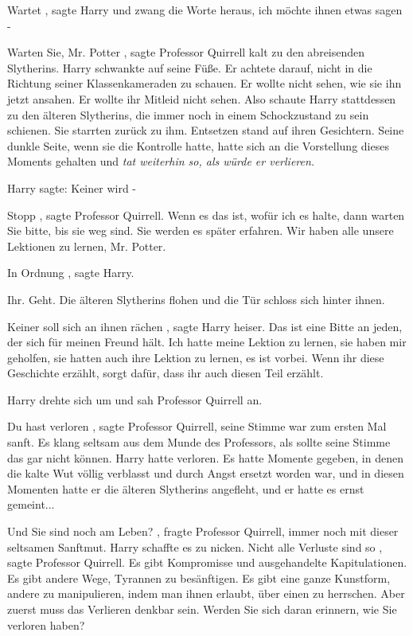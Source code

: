 \glqq Wartet\grqq{} , sagte Harry und zwang die Worte heraus, \glqq ich möchte
ihnen etwas sagen -\grqq{}

\glqq Warten Sie, Mr. Potter\grqq{} , sagte Professor Quirrell kalt zu den
abreisenden Slytherins. Harry schwankte auf seine Füße. Er achtete darauf, nicht
in die Richtung seiner Klassenkameraden zu schauen. Er wollte nicht sehen, wie
sie ihn jetzt ansahen. Er wollte ihr Mitleid nicht sehen. Also schaute Harry
stattdessen zu den älteren Slytherins, die immer noch in einem Schockzustand zu
sein schienen. Sie starrten zurück zu ihm. Entsetzen stand auf ihren Gesichtern.
Seine dunkle Seite, wenn sie die Kontrolle hatte, hatte sich an die Vorstellung
dieses Moments gehalten und \emph{tat weiterhin so, als würde er verlieren.}

Harry sagte: \glqq Keiner wird -\grqq{}

\glqq Stopp\grqq{} , sagte Professor Quirrell. \glqq Wenn es das ist, wofür ich
es halte, dann warten Sie bitte, bis sie weg sind. Sie werden es später
erfahren. Wir haben alle unsere Lektionen zu lernen, Mr. Potter.\grqq{}

\glqq In Ordnung\grqq{} , sagte Harry.

\glqq Ihr. Geht.\grqq{} Die älteren Slytherins flohen und die Tür schloss sich
hinter ihnen.

\glqq Keiner soll sich an ihnen rächen\grqq{} , sagte Harry heiser. \glqq Das
ist eine Bitte an jeden, der sich für meinen Freund hält. Ich hatte meine
Lektion zu lernen, sie haben mir geholfen, sie hatten auch ihre Lektion zu
lernen, es ist vorbei. Wenn ihr diese Geschichte erzählt, sorgt dafür, dass ihr
auch diesen Teil erzählt.\grqq{}

Harry drehte sich um und sah Professor Quirrell an.

\glqq Du hast verloren\grqq{} , sagte Professor Quirrell, seine Stimme war zum
ersten Mal sanft. Es klang seltsam aus dem Munde des Professors, als sollte
seine Stimme das gar nicht können. Harry hatte verloren. Es hatte Momente
gegeben, in denen die kalte Wut völlig verblasst und durch Angst ersetzt worden
war, und in diesen Momenten hatte er die älteren Slytherins angefleht, und er
hatte es ernst gemeint...

\glqq Und Sie sind noch am Leben?\grqq{} , fragte Professor Quirrell, immer noch
mit dieser seltsamen Sanftmut. Harry schaffte es zu nicken. \glqq Nicht alle
Verluste sind so\grqq{} , sagte Professor Quirrell. \glqq Es gibt Kompromisse
und ausgehandelte Kapitulationen. Es gibt andere Wege, Tyrannen zu besänftigen.
Es gibt eine ganze Kunstform, andere zu manipulieren, indem man ihnen erlaubt,
über einen zu herrschen. Aber zuerst muss das Verlieren denkbar sein. Werden Sie
sich daran erinnern, wie Sie verloren haben?\grqq{}

